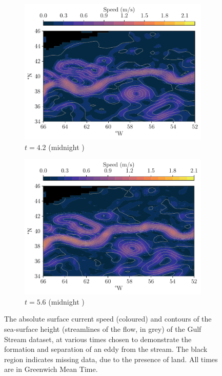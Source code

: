 \begin{figure}
\begin{center}
\begin{subfigure}{0.49\textwidth}
			\includegraphics[width=\textwidth]{chp06_applications/figures/gulf_stream/streamlines_10}
			\caption{\(t = 4.2\) (midnight )}
		\end{subfigure}
		\begin{subfigure}{0.49\textwidth}
			\includegraphics[width=\textwidth]{chp06_applications/figures/gulf_stream/streamlines_15}
			\caption{\(t =5.6\) (midnight )}
		\end{subfigure}
		\caption{The absolute surface current speed (coloured) and contours of the sea-surface height (streamlines of the flow, in grey) of the Gulf Stream dataset, at various times chosen to demonstrate the formation and separation of an eddy from the stream.
			The black region indicates missing data, due to the presence of land.
			All times are in Greenwich Mean Time.}
		\label{fig:na_motive_flow}
	\end{center}
\end{figure}




